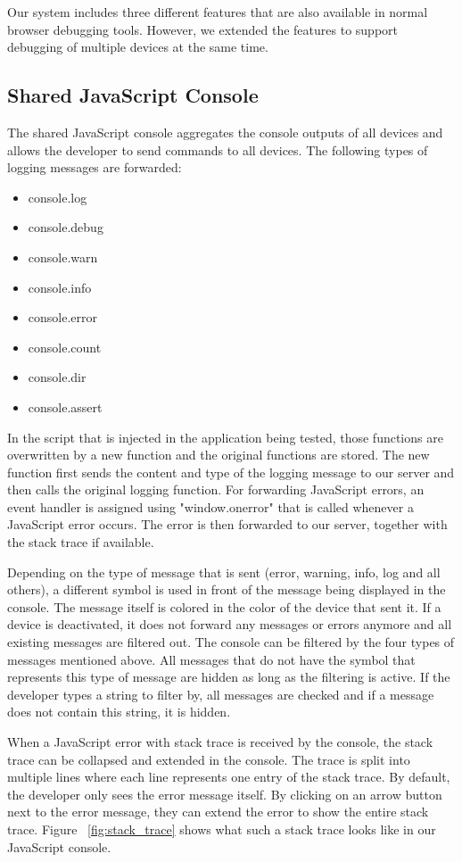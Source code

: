 Our system includes three different features that are also available in normal browser debugging tools. However, we extended the features to support debugging of multiple devices at the same time.

\subsection{Shared JavaScript Console}

The shared JavaScript console aggregates the console outputs of all devices and allows the developer to send commands to all devices. The following types of logging messages are forwarded:
\begin{itemize}
	\item console.log
	\item console.debug
	\item console.warn
	\item console.info
	\item console.error
	\item console.count
	\item console.dir
	\item console.assert
\end{itemize}
In the script that is injected in the application being tested, those functions are overwritten by a new function and the original functions are stored. The new function first sends the content and type of the logging message to our server and then calls the original logging function. For forwarding JavaScript errors, an event handler is assigned using "window.onerror" that is called whenever a JavaScript error occurs. The error is then forwarded to our server, together with the stack trace if available. 

Depending on the type of message that is sent (error, warning, info, log and all others), a different symbol is used in front of the message being displayed in the console. The message itself is colored in the color of the device that sent it. If a device is deactivated, it does not forward any messages or errors anymore and all existing messages are filtered out. The console can be filtered by the four types of messages mentioned above. All messages that do not have the symbol that represents this type of message are hidden as long as the filtering is active. If the developer types a string to filter by, all messages are checked and if a message does not contain this string, it is hidden.

When a JavaScript error with stack trace is received by the console, the stack trace can be collapsed and extended in the console. The trace is split into multiple lines where each line represents one entry of the stack trace. By default, the developer only sees the error message itself. By clicking on an arrow button next to the error message, they can extend the error to show the entire stack trace. Figure ~\ref{fig:stack_trace} shows what such a stack trace looks like in our JavaScript console.


